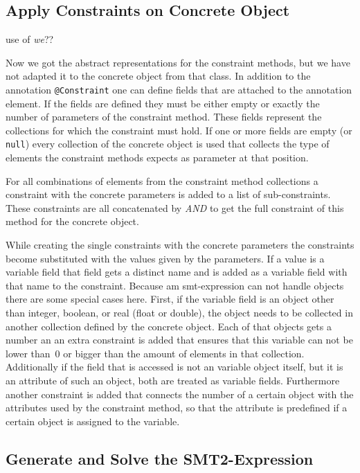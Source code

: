 \documentclass[conference]{IEEEtran}
\begin{document}
\subsection{Apply Constraints on Concrete Object}
\label{sec:impl_applying}

\danger use of \textit{we}??

Now we got the abstract representations for the constraint methods, but we
have not adapted it to the concrete object from that class. In addition to the
annotation \texttt{@Constraint} one can define fields that are attached to the
annotation element. If the fields are defined they must be either empty or
exactly the number of parameters of the constraint method. These fields
represent the collections for which the constraint must hold. If one or more
fields are empty (or \texttt{null}) every collection of the concrete object is
used that collects the type of elements the constraint methods expects as
parameter at that position.

For all combinations of elements from the constraint method collections a
constraint with the concrete parameters is added to a list of sub-constraints.
These constraints are all concatenated by \textit{AND} to get the full
constraint of this method for the concrete object.

While creating the single constraints with the concrete parameters the
constraints become substituted with the values given by the parameters. If a
value is a variable field that field gets a distinct name and is added as a
variable field with that name to the constraint. Because am smt-expression can
not handle objects there are some special cases here. First, if the variable
field is an object other than integer, boolean, or real (float or double), the
object needs to be collected in another collection defined by the concrete
object. Each of that objects gets a number an an extra constraint is added that
ensures that this variable can not be lower than~$0$ or bigger than the
amount of elements in that collection. Additionally if the field that is
accessed is not an variable object itself, but it is an attribute of such an
object, both are treated as variable fields. Furthermore another constraint is
added that connects the number of a certain object with the attributes used by
the constraint method, so that the attribute is predefined if a certain object
is assigned to the variable. 

\subsection{Generate and Solve the SMT2-Expression}
\label{sec:impl_generate_and_resolve}
\end{document}
